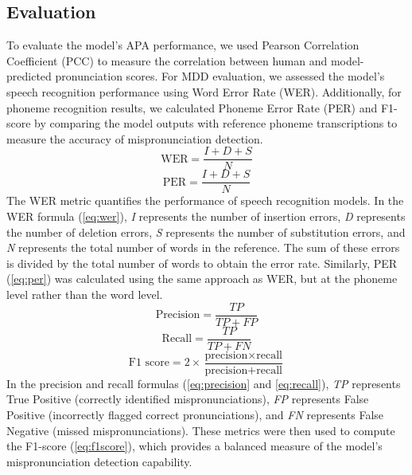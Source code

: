 \documentclass[sigconf,nonacm]{acmart}
\begin{document}
\subsection{Evaluation}
To evaluate the model's APA performance, we used Pearson Correlation Coefficient (PCC) to measure the correlation between human and model-predicted pronunciation scores. For MDD  evaluation, we assessed the model's speech recognition performance using Word Error Rate (WER). Additionally, for phoneme recognition results, we calculated Phoneme Error Rate (PER) and F1-score by comparing the model outputs with reference phoneme transcriptions to measure the accuracy of mispronunciation detection.
\begin{equation} \label{eq:wer}
\text{WER} = \frac{I + D + S}{N}
\end{equation}
\begin{equation} \label{eq:per}
\text{PER} = \frac{I + D + S}{N}
\end{equation}
The WER metric quantifies the performance of speech recognition models. In the WER formula (\ref{eq:wer}), \textit{I} represents the number of insertion errors, \textit{D} represents the number of deletion errors, \textit{S} represents the number of substitution errors, and \textit{N} represents the total number of words in the reference. The sum of these errors is divided by the total number of words to obtain the error rate. Similarly, PER (\ref{eq:per}) was calculated using the same approach as WER, but at the phoneme level rather than the word level.
\begin{equation}\label{eq:precision}
\text{Precision} = \frac{TP}{TP + FP}
\end{equation}
\begin{equation} \label{eq:recall}
\text{Recall} = \frac{TP}{TP + FN}
\end{equation}
\begin{equation} \label{eq:f1score}
\text{F1 score} = 2 \times \frac{\text{precision} \times \text{recall}}{\text{precision} + \text{recall}}
\end{equation}
In the precision and recall formulas (\ref{eq:precision} and \ref{eq:recall}), \textit{TP} represents True Positive (correctly identified mispronunciations), \textit{FP} represents False Positive (incorrectly flagged correct pronunciations), and \textit{FN} represents False Negative (missed mispronunciations). These metrics were then used to compute the F1-score (\ref{eq:f1score}), which provides a balanced measure of the model's mispronunciation detection capability.
\end{document}
